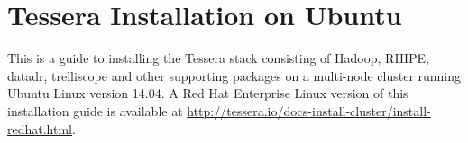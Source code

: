 \section{Tessera Installation on Ubuntu}

This is a guide to installing the Tessera stack consisting of
Hadoop, RHIPE, datadr, trelliscope and other supporting packages on
a multi-node cluster running Ubuntu Linux version 14.04.  A Red Hat
Enterprise Linux version of this installation guide is available at
\url{http://tessera.io/docs-install-cluster/install-redhat.html}.

